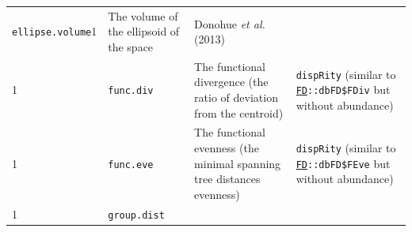 \documentclass[]{book}
\begin{document}
\begin{longtable}[]{@{}llll@{}}
\begin{minipage}[t]{0.07\columnwidth}
\texttt{ellipse.volume}1\strut
\end{minipage} & \begin{minipage}[t]{0.64\columnwidth}\raggedright
The volume of the ellipsoid of the space\strut
\end{minipage} & \begin{minipage}[t]{0.10\columnwidth}\raggedright
Donohue \emph{et al.} (2013)\strut
\end{minipage}\tabularnewline
\begin{minipage}[t]{0.07\columnwidth}\raggedright
1\strut
\end{minipage} & \begin{minipage}[t]{0.07\columnwidth}\raggedright
\texttt{func.div}\strut
\end{minipage} & \begin{minipage}[t]{0.64\columnwidth}\raggedright
The functional divergence (the ratio of deviation from the centroid)\strut
\end{minipage} & \begin{minipage}[t]{0.10\columnwidth}\raggedright
\texttt{dispRity} (similar to \href{https://cran.r-project.org/web/packages/FD/index.html}{\texttt{FD}}\texttt{::dbFD\$FDiv} but without abundance)\strut
\end{minipage}\tabularnewline
\begin{minipage}[t]{0.07\columnwidth}\raggedright
1\strut
\end{minipage} & \begin{minipage}[t]{0.07\columnwidth}\raggedright
\texttt{func.eve}\strut
\end{minipage} & \begin{minipage}[t]{0.64\columnwidth}\raggedright
The functional evenness (the minimal spanning tree distances evenness)\strut
\end{minipage} & \begin{minipage}[t]{0.10\columnwidth}\raggedright
\texttt{dispRity} (similar to \href{https://cran.r-project.org/web/packages/FD/index.html}{\texttt{FD}}\texttt{::dbFD\$FEve} but without abundance)\strut
\end{minipage}\tabularnewline
\begin{minipage}[t]{0.07\columnwidth}\raggedright
1\strut
\end{minipage} & \begin{minipage}[t]{0.07\columnwidth}\raggedright
\texttt{group.dist}\strut
\end{minipage} & \begin{minipage}[t]{0.64\columnwidth}\raggedright

\end{minipage}
\end{longtable}
\end{document}
